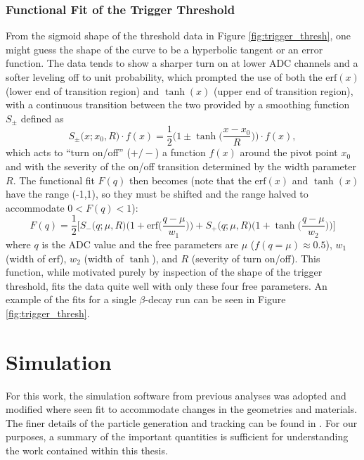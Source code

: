 \subsubsection{Functional Fit of the Trigger Threshold}
From the sigmoid shape of the threshold data in Figure \ref{fig:trigger_thresh}, one might guess
the shape of the curve to be a hyperbolic tangent or an error function. The data tends to show
a sharper turn on at lower ADC channels and a softer leveling off to unit probability, which
prompted the use of both the $\mathrm{erf}(x)$ (lower end of transition region)
and $\tanh(x)$ (upper end of transition region),
with a continuous transition between the
two provided by a smoothing function $S_\pm$ defined as
%
\begin{equation}
  S_\pm\big(x;x_0,R\big) \cdot f(x) = \frac{1}{2}\bigg(1\pm\tanh\Big(\frac{x-x_0}{R}\Big)\bigg) \cdot f(x),
\end{equation}
%
which acts to ``turn on/off'' ($+/-$) a function $f(x)$ around the pivot point $x_0$ and with the severity of
the on/off transition determined by the width parameter $R$. The functional fit $F(q)$ then becomes (note that the $\mathrm{erf}(x)$ and $\tanh(x)$ 
have the range (-1,1), so they must be shifted and the range halved to accommodate $0<F(q)<1$):
%
\begin{equation}
  F(q) = \frac{1}{2} \Bigg[ S_-\big(q;\mu,R\big) \bigg(1 + \mathrm{erf}\Big(\frac{q-\mu}{w_1}\Big)\bigg) +
  S_+\big(q;\mu,R\big) \bigg(1+\tanh\Big(\frac{q-\mu}{w_2}\Big)\bigg)\Bigg]
\end{equation}
%
where $q$ is the ADC value and
the free parameters are $\mu$ ($f(q=\mu)\approx 0.5$), $w_1$ (width of $\mathrm{erf}$), $w_2$ (width of $\tanh$), and $R$ (severity of turn on/off).
This function, while motivated purely by inspection of the shape of the trigger threshold, fits the data
quite well with only these four free parameters. An example of the fits for a single $\beta$-decay
run can be seen in Figure \ref{fig:trigger_thresh}. 



\section{Simulation}
\label{sec:Simulation}

For this work, the simulation software from previous analyses was adopted
and modified where seen fit to accommodate changes in the geometries
and materials. The finer details of the particle generation and
tracking can be found in \cite{mpmThesis}. For our purposes, a summary
of the important quantities is sufficient for understanding
the work contained within this thesis.

